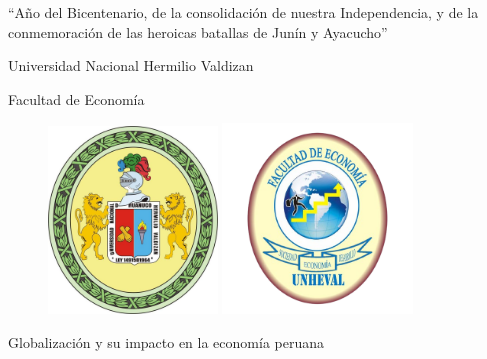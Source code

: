 \documentclass[12pt, a4paper]{article}
\begin{document}
\onehalfspacing

\begin{titlepage}
    \begin{center}
        \vspace{0.5in}
        \small “Año del Bicentenario, de la consolidación de nuestra Independencia, y de la conmemoración de las heroicas batallas de Junín y Ayacucho”
  
        
        \LARGE Universidad Nacional Hermilio Valdizan
        
        \Large Facultad de Economía
        
        \vspace{0.5cm}
        
        \begin{figure}[h!]
            \begin{center}
                \includegraphics[width=0.40\textwidth]{images/unheval.jpg}
                \hspace{0.5cm}  
                \includegraphics[width=0.45\textwidth]{images/economia.png}
            \end{center}
        \end{figure}
        
        \LARGE{Globalización y su impacto en la economía peruana}
        \vspace{0.5cm}


\end{center}
\end{titlepage}
\end{document}
